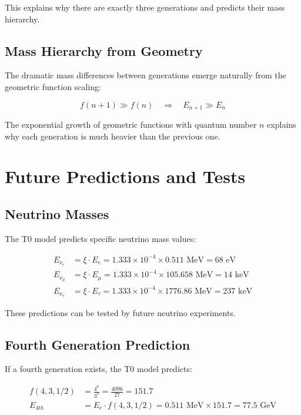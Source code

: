 \documentclass[12pt,a4paper]{report}
\begin{document}
This explains why there are exactly three generations and predicts their mass hierarchy.

\subsection{Mass Hierarchy from Geometry}
\label{subsec:mass_hierarchy_geometry}

The dramatic mass differences between generations emerge naturally from the geometric function scaling:

\begin{equation}
	f(n+1) \gg f(n) \quad \Rightarrow \quad E_{n+1} \gg E_n
\end{equation}

The exponential growth of geometric functions with quantum number $n$ explains why each generation is much heavier than the previous one.

\section{Future Predictions and Tests}
\label{sec:future_predictions}

\subsection{Neutrino Masses}
\label{subsec:neutrino_masses}

The T0 model predicts specific neutrino mass values:

\begin{align}
	E_{\nu_e} &= \xi \cdot E_e = 1.333 \times 10^{-4} \times 0.511 \text{ MeV} = 68 \text{ eV} \\
	E_{\nu_\mu} &= \xi \cdot E_\mu = 1.333 \times 10^{-4} \times 105.658 \text{ MeV} = 14 \text{ keV} \\
	E_{\nu_\tau} &= \xi \cdot E_\tau = 1.333 \times 10^{-4} \times 1776.86 \text{ MeV} = 237 \text{ keV}
\end{align}

These predictions can be tested by future neutrino experiments.

\subsection{Fourth Generation Prediction}
\label{subsec:fourth_generation}

If a fourth generation exists, the T0 model predicts:

\begin{align}
	f(4,3,1/2) &= \frac{4^6}{3^3} = \frac{4096}{27} = 151.7 \\
	E_{4th} &= E_e \cdot f(4,3,1/2) = 0.511 \text{ MeV} \times 151.7 = 77.5 \text{ GeV}
\end{align}
\end{document}
